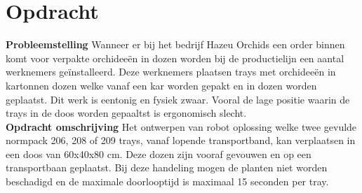 \section{Opdracht}
\begin{flushleft}
	\textbf{Probleemstelling}
	Wanneer er bij het bedrijf Hazeu Orchids een order binnen komt voor verpakte orchideeën in dozen worden bij de productielijn een aantal werknemers geïnstalleerd. Deze werknemers plaatsen trays met orchideeën in kartonnen dozen welke vanaf een kar worden gepakt en in dozen worden geplaatst. Dit werk is eentonig en fysiek zwaar. Vooral de lage positie waarin de trays in de doos worden gepaaltst is ergonomisch slecht.\\[0.5cm]
	
	
	\textbf{Opdracht omschrijving}
	Het ontwerpen van robot oplossing welke twee gevulde normpack  206, 208 of 209 trays, vanaf lopende transportband, kan verplaatsen in een doos van 60x40x80 cm. Deze dozen zijn vooraf gevouwen en op een transportbaan geplaatst. Bij deze handeling mogen de planten niet worden beschadigd en de maximale doorlooptijd is maximaal 15 seconden per tray.
	
	
\end{flushleft}

\newpage